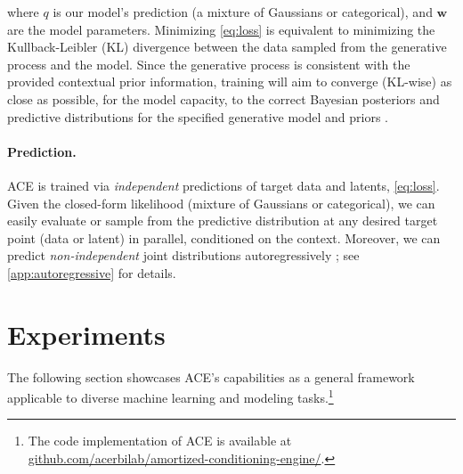 \documentclass[twoside]{article}
\begin{document}
\noindent where $q$ is our model's prediction (a mixture of Gaussians or categorical), and $\textbf{w}$ are the model parameters. Minimizing \cref{eq:loss} is equivalent to minimizing the Kullback-Leibler (KL) divergence between the data sampled from the generative process and the model. %
Since the generative process is consistent with the provided contextual prior information, training will aim to converge (KL-wise) as close as possible, for the model capacity, to the correct Bayesian posteriors and predictive distributions for the specified generative model and priors \citep{muller2022transformers, elsemueller2024sensitivity}.

\vspace{-0.25em}
\paragraph{Prediction.} ACE is trained via \emph{independent} predictions of target data and latents, \cref{eq:loss}. Given the closed-form likelihood (mixture of Gaussians or categorical), we can easily evaluate or sample from the predictive distribution at any desired target point (data or latent) in parallel, conditioned on the context. Moreover, we can predict \emph{non-independent} joint distributions autoregressively \citep{nguyen2022transformer,bruinsma2023autoregressive}; see \cref{app:autoregressive} for details.



\section{Experiments}
\label{sec:experiments}

\vspace{-0.25em}
The following section showcases ACE's capabilities as a general framework applicable to diverse machine learning and modeling tasks.\footnote{The code implementation of ACE is available at \href{https://github.com/acerbilab/amortized-conditioning-engine/}{github.com/acerbilab/amortized-conditioning-engine/}.}
\end{document}

